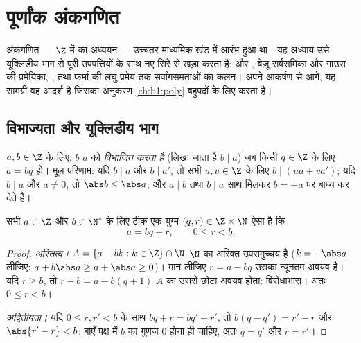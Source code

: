 \chapter{पूर्णांक अंकगणित}\label{ch:b1:arith}

अंकगणित --- $\Z$ में  का अध्ययन --- उच्चतर माध्यमिक खंड में आरंभ
हुआ था। यह अध्याय उसे यूक्लिडीय भाग से पूरी उपपत्तियों के साथ नए सिरे से
खड़ा करता है:  और , बेज़ू सर्वसमिका और गाउस
की प्रमेयिका, , तथा फर्मा की लघु प्रमेय तक सर्वांगसमताओं का
कलन। अपने आकर्षण से आगे, यह सामग्री वह आदर्श है जिसका अनुकरण
\cref{ch:b1:poly} बहुपदों के लिए करता है।

\section{विभाज्यता और यूक्लिडीय भाग}

\begin{definition}[विभाज्यता]\label{def:b1:arith:divides}
$a, b \in \Z$ के लिए, $b$ $a$ को \emph{विभाजित करता है} (लिखा जाता है $b
\mid a$) जब किसी $q \in \Z$ के लिए $a = bq$ हो। मूल परिणाम:
यदि $b \mid a$ और $b \mid a'$, तो सभी $u, v \in \Z$ के लिए $b \mid (ua +
va')$; यदि $b \mid a$ और $a \neq 0$, तो $\abs b \leq \abs a$; और $a \mid b$
तथा $b \mid a$ साथ मिलकर $b = \pm a$ पर बाध्य कर देते हैं।
\end{definition}

\begin{theorem}[यूक्लिडीय भाग]\label{thm:b1:arith:division}
सभी $a \in \Z$ और $b \in \N^*$ के लिए ठीक एक युग्म $(q, r) \in \Z \times \N$
ऐसा है कि
\[
a = bq + r, \qquad 0 \leq r < b .
\]
\end{theorem}

\begin{proof}
\emph{अस्तित्व।}  $A = \{a - bk : k \in \Z\} \cap \N$ $\N$ का अरिक्त
उपसमुच्चय है ($k = -\abs a$ लीजिए: $a + b\abs a \geq a + \abs a \geq 0$)।
मान लीजिए $r = a - bq$ उसका न्यूनतम अवयव है। यदि $r \geq b$, तो $r - b = a -
b(q+1)$ $A$ का उससे छोटा अवयव होता: विरोधाभास। अतः $0 \leq r < b$।

\emph{अद्वितीयता।} यदि $0 \leq r, r' < b$ के साथ $bq + r = bq' + r'$, तो
$b(q - q') = r' - r$ और $\abs{r' - r} < b$: बाएँ पक्ष में $b$ का गुणज $0$
होना ही चाहिए, अतः $q = q'$ और $r = r'$।
\end{proof}

